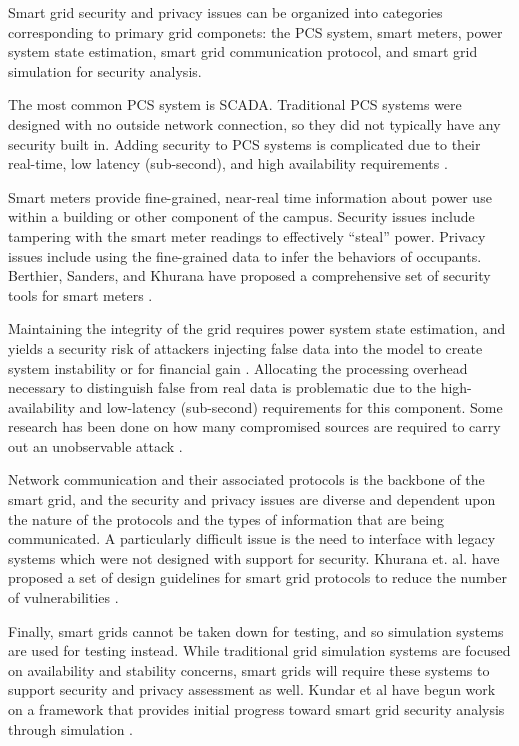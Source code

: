 Smart grid security and privacy issues can be organized into categories
corresponding to primary grid componets: the PCS system, smart meters,
power system state estimation, smart grid communication protocol, and smart
grid simulation for security analysis. 

The most common PCS system is SCADA.  Traditional PCS systems were designed
with no outside network connection, so they did not typically have any
security built in.  Adding security to PCS systems is complicated due to
their real-time, low latency (sub-second), and high availability
requirements \cite{Valdes2009}. 

Smart meters provide fine-grained, near-real time information about power
use within a building or other component of the campus.  Security issues
include tampering with the smart meter readings to effectively ``steal''
power. Privacy issues include using the fine-grained data to infer the
behaviors of occupants. Berthier, Sanders, and Khurana have proposed a
comprehensive set of security tools for smart meters \cite{Berthier2010}.

Maintaining the integrity of the grid requires power system state
estimation, and yields a security risk of attackers injecting false data
into the model to create system instability or for financial gain
\cite{Xie2010}.  Allocating the processing overhead necessary to
distinguish false from real data is problematic due to the
high-availability and low-latency (sub-second) requirements for this
component. Some research has been done on how many compromised sources are
required to carry out an unobservable attack \cite{Kosut2010}.

Network communication and their associated protocols is the backbone of the
smart grid, and the security and privacy issues are diverse and dependent
upon the nature of the protocols and the types of information that are
being communicated. A particularly difficult issue is the need to interface
with legacy systems which were not designed with support for security.
Khurana et. al. have proposed a set of design guidelines for smart grid
protocols to reduce the number of vulnerabilities \cite{Khurana2010}.

Finally, smart grids cannot be taken down for testing, and so simulation
systems are used for testing instead.  While traditional grid simulation
systems are focused on availability and stability concerns, smart grids
will require these systems to support security and privacy assessment as
well. Kundar et al have begun work on a framework that provides initial
progress toward smart grid security analysis through simulation
\cite{Kundur2010}.

